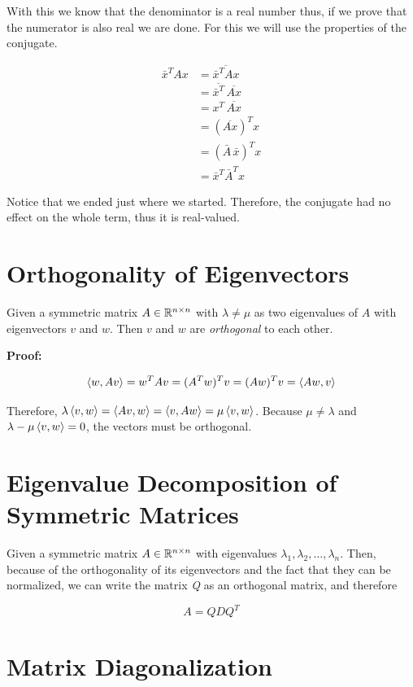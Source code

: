 With this we know that the denominator is a real number thus, if we prove that the numerator is also real 
we are done. For this we will use the properties of the conjugate.

\begin{align*}
    \bar{x}^T A x 
    &= \overline{\bar{x}^T A x} \\
    &= \overline{\bar{x}^T} \, \overline{A x} \\
    &= x^T \, \overline{A x} \\
    &= (\overline{A x})^T x \\
    &= (\bar{A} \, \bar{x})^T x \\
    &= \bar{x}^T \bar{A}^T x
\end{align*}

Notice that we ended just where we started. Therefore, the conjugate had no effect on the whole term, thus 
it is real-valued.

\QED

\section{Orthogonality of Eigenvectors}

Given a symmetric matrix \(A \in \mathbb{R}^{n \times n}\) with \(\lambda \ne \mu \) as two eigenvalues of 
\(A\) with eigenvectors \(v\) and \(w\). Then \(v\) and \(w\) are \emph{orthogonal} to each other.

\textbf{Proof:}

\[
    \left\langle w, Av\right\rangle = w^{T} Av = (A^T w)^T v = (Aw)^T v = \left\langle Aw, v\right\rangle
\]

Therefore, \(\lambda \left\langle v, w\right\rangle = \left\langle Av, w\right\rangle = \left\langle v, Aw\right\rangle 
= \mu \left\langle v, w\right\rangle\). Because \(\mu \ne \lambda\) and \(\lambda - \mu \left\langle v, w\right\rangle = 0\), 
the vectors must be orthogonal.

\QED

\section{Eigenvalue Decomposition of Symmetric Matrices}

Given a symmetric matrix \(A \in \mathbb{R}^{n \times n}\) with eigenvalues 
\(\lambda_1, \lambda_2, \dots, \lambda_n\). Then, because of the orthogonality of its eigenvectors and 
the fact that they can be normalized, we can write the matrix \emph{Q} as an orthogonal matrix, and therefore

\[
    A = Q D Q^T
\]

\section{Matrix Diagonalization}

